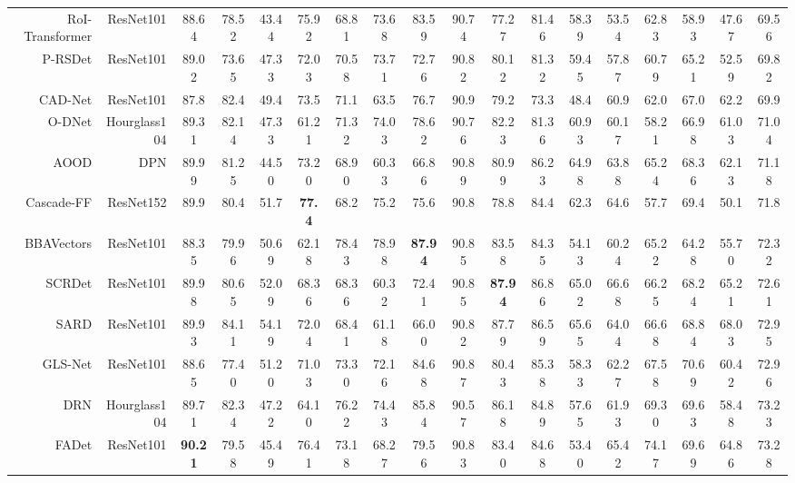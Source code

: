 \documentclass[10pt,journal,compsoc]{IEEEtran}
\begin{document}
\begin{table*}[tb!]
{\begin{tabular}{r|r|c|c|c|c|c|c|c|c|c|c|c|c|c|c|c|c}
			RoI-Transformer \cite{ding2018learning} & ResNet101 & 88.64 & 78.52 & 43.44 & 75.92 & 68.81 & 73.68 & 83.59 & 90.74 & 77.27 & 81.46 & 58.39 & 53.54 & 62.83 & 58.93 & 47.67 & 69.56 \\
			P-RSDet \cite{zhou2020arbitrary}	& ResNet101 & 89.02 & 73.65 & 47.33 & 72.03 & 70.58 & 73.71 & 72.76 & 90.82 & 80.12 & 81.32 & 59.45 & 57.87 & 60.79 & 65.21 & 52.59 & 69.82 \\
			CAD-Net \cite{zhang2019cad} & ResNet101 & 87.8 & 82.4 & 49.4 & 73.5 & 71.1 & 63.5 & 76.7 & 90.9 & 79.2 & 73.3 & 48.4 & 60.9 & 62.0 & 67.0 & 62.2 & 69.9 \\
			O-DNet \cite{wei2020oriented} & Hourglass104 \cite{newell2016stacked} & 89.31 & 82.14 & 47.33 & 61.21 & 71.32 & 74.03 & 78.62 & 90.76 & 82.23 & 81.36 & 60.93 & 60.17 & 58.21 & 66.98 & 61.03 & 71.04 \\
			AOOD \cite{zou2020arbitrary} & DPN \cite{chen2017dual} & 89.99 & 81.25 & 44.50 & 73.20 & 68.90 & 60.33 & 66.86 & 90.89 & 80.99 & 86.23 & 64.98 & 63.88 & 65.24 & 68.36 & 62.13 & 71.18 \\
			Cascade-FF \cite{hou2020cascade} & ResNet152 & 89.9 & 80.4 & 51.7 & \textbf{77.4} & 68.2 & 75.2 & 75.6 & 90.8 & 78.8 & 84.4 & 62.3 & 64.6 & 57.7 & 69.4 & 50.1 & 71.8 \\
			BBAVectors \cite{yi2021oriented} & ResNet101 & 88.35 & 79.96 & 50.69 & 62.18 & 78.43 & 78.98 & \textbf{87.94} & 90.85 & 83.58 & 84.35 & 54.13 & 60.24 & 65.22 & 64.28 & 55.70 & 72.32 \\
			SCRDet \cite{yang2019scrdet} & ResNet101 & 89.98 & 80.65 & 52.09 & 68.36 & 68.36 & 60.32 & 72.41 & 90.85 & \textbf{87.94} & 86.86 & 65.02 & 66.68 & 66.25 & 68.24 & 65.21 & 72.61\\
			SARD \cite{wang2019sard} & ResNet101 & 89.93 & 84.11 & 54.19 & 72.04 & 68.41 & 61.18 & 66.00 & 90.82 & 87.79 & 86.59 & 65.65 & 64.04 & 66.68 & 68.84 & 68.03 & 72.95 \\
			GLS-Net \cite{li2020object} & ResNet101 & 88.65 & 77.40 & 51.20 & 71.03 & 73.30 & 72.16 & 84.68 & 90.87 & 80.43 & 85.38 & 58.33 & 62.27 & 67.58 & 70.69 & 60.42 & 72.96 \\
			DRN \cite{pan2020dynamic} & Hourglass104 & 89.71 & 82.34 & 47.22 & 64.10 & 76.22 & 74.43 & 85.84 & 90.57 & 86.18 & 84.89 & 57.65 & 61.93 & 69.30 & 69.63 & 58.48 & 73.23 \\
			FADet \cite{li2019feature} & ResNet101 & \textbf{90.21} & 79.58 & 45.49 & 76.41 & 73.18 & 68.27 & 79.56 & 90.83 & 83.40 & 84.68 & 53.40 & 65.42 & 74.17 & 69.69 & 64.86 & 73.28\\

\end{tabular}}
\end{table*}
\end{document}
